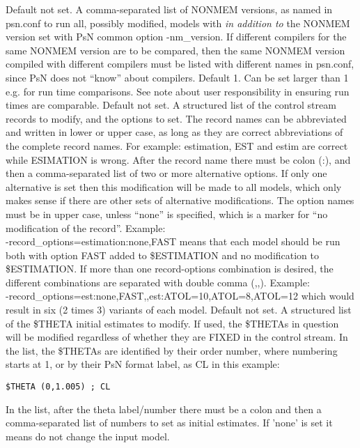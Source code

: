 \begin{optionlist}
Default not set. 
A comma-separated list of NONMEM versions, as named in psn.conf to run all, possibly modified, models with
\emph{in addition to} the NONMEM version set with PsN common option -nm\_version.
If different compilers for the same NONMEM version are to be compared, 
then the same NONMEM version compiled with different compilers
must be listed with different names in psn.conf, since PsN does not ``know'' about compilers.
\nextopt
{}
Default 1. Can be set larger than 1 e.g. for run time comparisons.
See note about user responsibility in ensuring run times are comparable.
\nextopt
{}
Default not set.
A structured list of the control stream records to modify, and the options to set. 
The record names can be abbreviated and written in lower or upper case,
as long as they are correct abbreviations of the complete record names. 
For example: estimation, EST and estim are correct while ESIMATION
is wrong. After the record name there must be colon (:), and then
a comma-separated list of two or more alternative options.
If only one alternative is set then this modification will be made to all models, which only makes
sense if there are other sets of alternative modifications.
The option names must be in upper case, unless ``none'' is specified, which is 
a marker for ``no modification of the record''. Example: \\
-record\_options=estimation:none,FAST means that
each model should be run both with option FAST added to \$ESTIMATION and no modification to \$ESTIMATION.
If more than one record-options combination is desired, the different combinations are 
separated with double comma (,,). Example: \\
-record\_options=est:none,FAST,,est:ATOL=10,ATOL=8,ATOL=12 
which would result in six (2 times 3) variants of each model.
\nextopt
{}
Default not set.
A structured list of the \$THETA initial estimates to modify. If used, the 
\$THETAs in question will be modified regardless of whether they are FIXED in the control stream.
In the list, the \$THETAs are identified by their order number, where numbering starts at 1,
or by their PsN format label, as CL in this example:
\begin{verbatim}
$THETA (0,1.005) ; CL
\end{verbatim}
In the list, after the theta label/number there must be a colon and then a comma-separated list of numbers
to set as initial estimates. If 'none' is set it means do not change the input model.

\end{optionlist}

